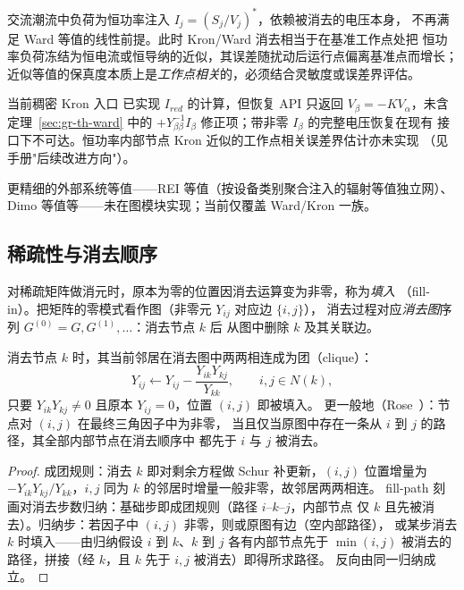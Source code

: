 \begin{remark}[恒功率注入导致的近似]
交流潮流中负荷为恒功率注入 $I_j=(S_j/V_j)^{*}$，依赖被消去的电压本身，
不再满足 Ward 等值的线性前提。此时 Kron/Ward 消去相当于在基准工作点处把
恒功率负荷冻结为恒电流或恒导纳的近似，其误差随扰动后运行点偏离基准点而增长；
近似等值的保真度本质上是\emph{工作点相关}的，必须结合灵敏度或误差界评估。
\end{remark}

\begin{gapnote}
当前稠密 Kron 入口  已实现
$I_{red}$ 的计算，但恢复 API  只返回
$V_\beta=-KV_\alpha$，未含定理~\ref{sec:gr-th-ward} 中的
$+Y_{\beta\beta}^{-1}I_\beta$ 修正项；带非零 $I_\beta$ 的完整电压恢复在现有
接口下不可达。恒功率内部节点 Kron 近似的工作点相关误差界估计亦未实现
（见手册"后续改进方向"）。
\end{gapnote}

\begin{gapnote}
更精细的外部系统等值——REI 等值（按设备类别聚合注入的辐射等值独立网）、
Dimo 等值等——未在图模块实现；当前仅覆盖 Ward/Kron 一族。
\end{gapnote}

\subsection{稀疏性与消去顺序}\label{sec:gr-th-sparsity}

\begin{definition}
对稀疏矩阵做消元时，原本为零的位置因消去运算变为非零，称为\emph{填入}
（fill-in）。把矩阵的零模式看作图（非零元 $Y_{ij}$ 对应边 $\{i,j\}$），
消去过程对应\emph{消去图}序列 $G^{(0)}=G,G^{(1)},\dots$：消去节点 $k$ 后
从图中删除 $k$ 及其关联边。
\end{definition}

\begin{theorem}\label{sec:gr-th-fill}
消去节点 $k$ 时，其当前邻居在消去图中两两相连成为团（clique）：
\begin{equation}
Y_{ij}\leftarrow Y_{ij}-\frac{Y_{ik}Y_{kj}}{Y_{kk}},\qquad i,j\in N(k),
\end{equation}
只要 $Y_{ik}Y_{kj}\ne0$ 且原本 $Y_{ij}=0$，位置 $(i,j)$ 即被填入。
更一般地（Rose~\cite{grf:rose}）：节点对 $(i,j)$ 在最终三角因子中为非零，
当且仅当原图中存在一条从 $i$ 到 $j$ 的路径，其全部内部节点在消去顺序中
都先于 $i$ 与 $j$ 被消去。
\end{theorem}
\begin{proof}
成团规则：消去 $k$ 即对剩余方程做 Schur 补更新，$(i,j)$ 位置增量为
$-Y_{ik}Y_{kj}/Y_{kk}$，$i,j$ 同为 $k$ 的邻居时增量一般非零，故邻居两两相连。
fill-path 刻画对消去步数归纳：基础步即成团规则（路径 $i$--$k$--$j$，内部节点
仅 $k$ 且先被消去）。归纳步：若因子中 $(i,j)$ 非零，则或原图有边（空内部路径），
或某步消去 $k$ 时填入——由归纳假设 $i$ 到 $k$、$k$ 到 $j$ 各有内部节点先于
$\min(i,j)$ 被消去的路径，拼接（经 $k$，且 $k$ 先于 $i,j$ 被消去）即得所求路径。
反向由同一归纳成立。
\end{proof}

